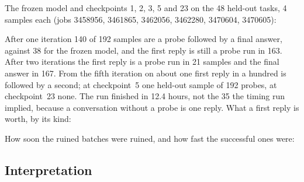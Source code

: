 \documentclass[11pt,a4paper]{article}
\begin{document}
The frozen model and checkpoints 1, 2, 3, 5 and 23 on the 48 held-out tasks,
4 samples each (jobs 3458956, 3461865, 3462056, 3462280, 3470604, 3470605):

\begin{center}\small
\resizebox{\linewidth}{!}{}
\end{center}

\begin{center}\small

\end{center}

After one iteration 140 of 192 samples are a probe followed by a final
answer, against 38 for the frozen model, and the first reply is still a
probe run in 163. After two iterations the first reply is a probe run in 21
samples and the final answer in 167. From the fifth iteration on about one
first reply in a hundred is followed by a second; at checkpoint~5 one
held-out sample of 192 probes, at checkpoint~23 none. The run finished in 12.4
hours, not the 35 the timing run implied, because a conversation without a
probe is one reply. What a first reply is worth, by its kind:

\begin{center}\small
\resizebox{0.9\linewidth}{!}{}
\end{center}

How soon the ruined batches were ruined, and how fast the successful ones
were:

\begin{center}\small

\end{center}

\subsection*{Interpretation}
\end{document}
